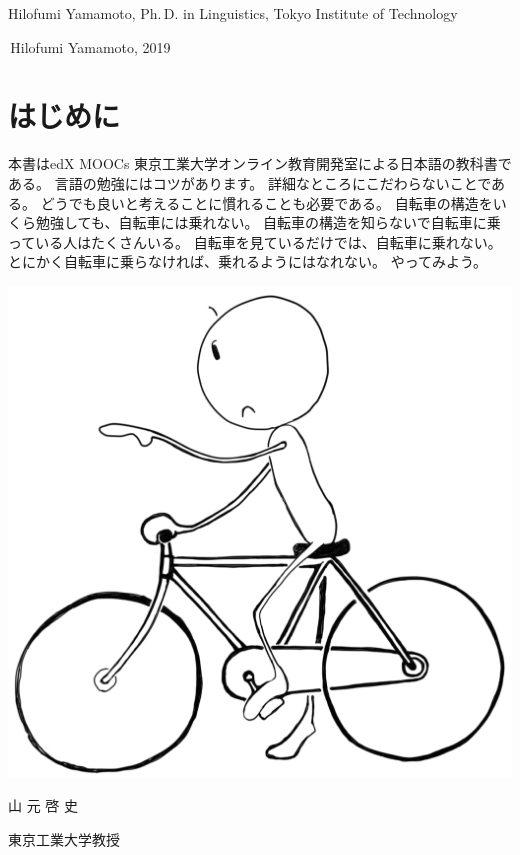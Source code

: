 \documentclass[
uplatex,
b5paper,
10pt,
dvipdfmx
]{jsbook}
\newif\ifEnglish
\newif\ifPreface
\begin{document}
Hilofumi Yamamoto, Ph.\,D. in Linguistics, Tokyo Institute of Technology

\textcopyright\,Hilofumi Yamamoto, 2019


\ifPreface
\ifEnglish
\chapter*{Preface}
\else
\chapter*{はじめに}
\fi

\ifEnglish
This is one of the Japanese textbooks by edX MOOCs Tokyo Institute of Technology Online Education Development Room.
There is a knack to studying languages.
You should not stick to the details of it.
It is also necessary to get used to thinking that it does not matter.
No matter how much the structure of the bicycle you study, you will not be able to ride a bicycle.
There are many people who are riding a bicycle with no knowledge of the structure of the bicycle.
Just watching a bicycle will not allow you to ride a bicycle.
Anyway, if you do not ride a bicycle, you will not be able to ride.
Let's try it.

\else

本書はedX MOOCs 東京工業大学オンライン教育開発室による日本語の教科書である。
言語の勉強にはコツがあります。
詳細なところにこだわらないことである。
どうでも良いと考えることに慣れることも必要である。
自転車の構造をいくら勉強しても、自転車には乗れない。
自転車の構造を知らないで自転車に乗っている人はたくさんいる。
自転車を見ているだけでは、自転車に乗れない。
とにかく自転車に乗らなければ、乗れるようにはなれない。
やってみよう。
\fi

\vspace*{1\baselineskip}
\begin{flushright}
 \includegraphics[width=.2\hsize]{bicycle201801.pdf}

 \ifEnglish
 Hilofumi Yamamoto, Ph.\,D.\\
 Professor of Linguistics\\
 Tokyo Institute of Technology\\
 \else
 {\large 山 元 啓 史}\hspace*{3zw}
 
 {\small 東京工業大学教授\hspace*{2zw}}
\fi
\end{flushright}
\end{document}
